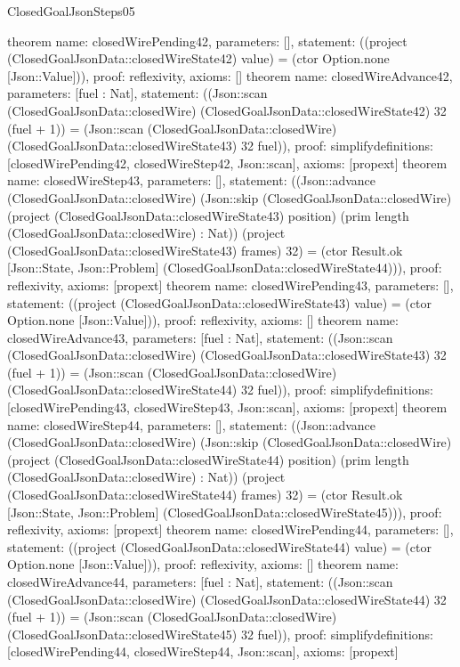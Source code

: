\begin{lexlean}{ClosedGoalJsonSteps05}
\begin{semanticmodule}
{}
theorem{
 name: closedWirePending42, parameters: [],
 statement: ((project (ClosedGoalJsonData::closedWireState42) value) = (ctor Option.none [Json::Value])), proof: reflexivity{}, axioms: []
}
theorem{
 name: closedWireAdvance42, parameters: [fuel : Nat],
 statement: ((Json::scan (ClosedGoalJsonData::closedWire) (ClosedGoalJsonData::closedWireState42) 32 (fuel + 1)) = (Json::scan (ClosedGoalJsonData::closedWire) (ClosedGoalJsonData::closedWireState43) 32 fuel)), proof: simplify{definitions: [closedWirePending42, closedWireStep42, Json::scan]}, axioms: [propext]
}
theorem{
 name: closedWireStep43, parameters: [],
 statement: ((Json::advance (ClosedGoalJsonData::closedWire) (Json::skip (ClosedGoalJsonData::closedWire) (project (ClosedGoalJsonData::closedWireState43) position) (prim length (ClosedGoalJsonData::closedWire) : Nat)) (project (ClosedGoalJsonData::closedWireState43) frames) 32) = (ctor Result.ok [Json::State, Json::Problem] (ClosedGoalJsonData::closedWireState44))), proof: reflexivity{}, axioms: [propext]
}
theorem{
 name: closedWirePending43, parameters: [],
 statement: ((project (ClosedGoalJsonData::closedWireState43) value) = (ctor Option.none [Json::Value])), proof: reflexivity{}, axioms: []
}
theorem{
 name: closedWireAdvance43, parameters: [fuel : Nat],
 statement: ((Json::scan (ClosedGoalJsonData::closedWire) (ClosedGoalJsonData::closedWireState43) 32 (fuel + 1)) = (Json::scan (ClosedGoalJsonData::closedWire) (ClosedGoalJsonData::closedWireState44) 32 fuel)), proof: simplify{definitions: [closedWirePending43, closedWireStep43, Json::scan]}, axioms: [propext]
}
theorem{
 name: closedWireStep44, parameters: [],
 statement: ((Json::advance (ClosedGoalJsonData::closedWire) (Json::skip (ClosedGoalJsonData::closedWire) (project (ClosedGoalJsonData::closedWireState44) position) (prim length (ClosedGoalJsonData::closedWire) : Nat)) (project (ClosedGoalJsonData::closedWireState44) frames) 32) = (ctor Result.ok [Json::State, Json::Problem] (ClosedGoalJsonData::closedWireState45))), proof: reflexivity{}, axioms: [propext]
}
theorem{
 name: closedWirePending44, parameters: [],
 statement: ((project (ClosedGoalJsonData::closedWireState44) value) = (ctor Option.none [Json::Value])), proof: reflexivity{}, axioms: []
}
theorem{
 name: closedWireAdvance44, parameters: [fuel : Nat],
 statement: ((Json::scan (ClosedGoalJsonData::closedWire) (ClosedGoalJsonData::closedWireState44) 32 (fuel + 1)) = (Json::scan (ClosedGoalJsonData::closedWire) (ClosedGoalJsonData::closedWireState45) 32 fuel)), proof: simplify{definitions: [closedWirePending44, closedWireStep44, Json::scan]}, axioms: [propext]
}
\end{semanticmodule}
\end{lexlean}
